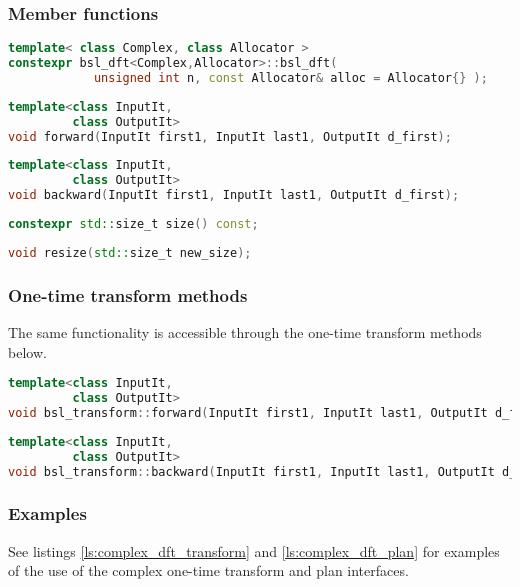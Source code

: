 \subsubsection*{Member functions}
\begin{lstlisting}[language=C++,caption=Complex plan constructor.]
template< class Complex, class Allocator >
constexpr bsl_dft<Complex,Allocator>::bsl_dft(
            unsigned int n, const Allocator& alloc = Allocator{} );
\end{lstlisting}
\begin{lstlisting}[language=C++,caption=Complex plan forward function.]
template<class InputIt,
         class OutputIt>
void forward(InputIt first1, InputIt last1, OutputIt d_first);
\end{lstlisting}
\begin{lstlisting}[language=C++,caption=Complex plan backward function.]
template<class InputIt,
         class OutputIt>
void backward(InputIt first1, InputIt last1, OutputIt d_first);
\end{lstlisting}
\begin{lstlisting}[language=C++,caption=Complex plan size.]
constexpr std::size_t size() const;
\end{lstlisting}
\begin{lstlisting}[language=C++,caption=Resize.]
void resize(std::size_t new_size);
\end{lstlisting}

\subsubsection*{One-time transform methods}
The same functionality is accessible through the one-time transform methods
below.
\begin{lstlisting}[language=C++,caption=Forward complex transform.]
template<class InputIt,
         class OutputIt>
void bsl_transform::forward(InputIt first1, InputIt last1, OutputIt d_first);
\end{lstlisting}
\begin{lstlisting}[language=C++,caption=Backward complex transform.]
template<class InputIt,
         class OutputIt>
void bsl_transform::backward(InputIt first1, InputIt last1, OutputIt d_first);
\end{lstlisting}

\subsubsection*{Examples}
See listings \ref{ls:complex_dft_transform} and \ref{ls:complex_dft_plan} 
for examples of the use of the complex one-time transform and plan interfaces.

